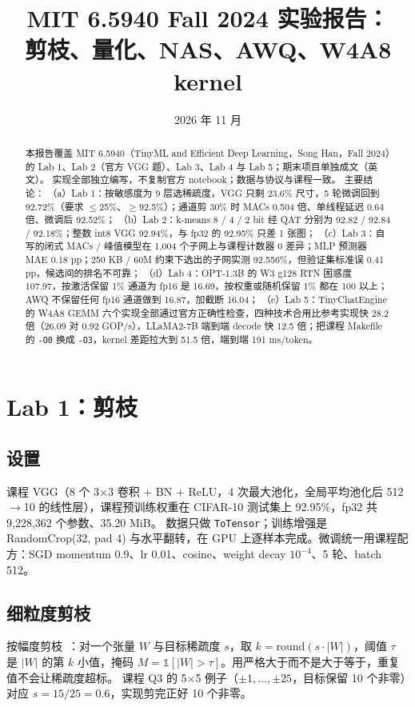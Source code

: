 \documentclass[11pt,a4paper]{ctexart}
\title{MIT 6.5940 Fall 2024 实验报告：\\剪枝、量化、NAS、AWQ、W4A8 kernel}
\author{\authorline}
\date{2026 年 11 月}
\begin{document}
\maketitle

\begin{abstract}
本报告覆盖 MIT 6.5940（TinyML and Efficient Deep Learning，Song Han，Fall 2024）的 Lab 1、Lab 2（官方 VGG 题）、Lab 3、Lab 4 与 Lab 5；期末项目单独成文（英文）。
实现全部独立编写，不复制官方 notebook；数据与协议与课程一致。
主要结论：
（a）Lab 1：按敏感度为 9 层选稀疏度，VGG 只剩 23.6\% 尺寸，5 轮微调回到 92.72\%（要求 $\le$25\%、$\ge$92.5\%）；通道剪 30\% 时 MACs 0.504 倍、单线程延迟 0.64 倍、微调后 92.52\%；
（b）Lab 2：k-means 8 / 4 / 2 bit 经 QAT 分别为 92.82 / 92.84 / 92.18\%；整数 int8 VGG 92.94\%，与 fp32 的 92.95\% 只差 1 张图；
（c）Lab 3：自写的闭式 MACs / 峰值模型在 1,004 个子网上与课程计数器 0 差异；MLP 预测器 MAE 0.18 pp；250 KB / 60M 约束下选出的子网实测 92.556\%，但验证集标准误 0.41 pp，候选间的排名不可靠；
（d）Lab 4：OPT-1.3B 的 W3 g128 RTN 困惑度 107.97，按激活保留 1\% 通道为 fp16 是 16.69，按权重或随机保留 1\% 都在 100 以上；AWQ 不保留任何 fp16 通道做到 16.87，加截断 16.04；
（e）Lab 5：TinyChatEngine 的 W4A8 GEMM 六个实现全部通过官方正确性检查，四种技术合用比参考实现快 28.2 倍（26.09 对 0.92 GOP/s），LLaMA2-7B 端到端 decode 快 12.5 倍；把课程 Makefile 的 \texttt{-O0} 换成 \texttt{-O3}，kernel 差距拉大到 51.5 倍，端到端 191 ms/token。
\end{abstract}

\tableofcontents
\newpage

\section{Lab 1：剪枝}\label{sec:lab1}

\subsection{设置}
课程 VGG（8 个 3$\times$3 卷积 + BN + ReLU，4 次最大池化，全局平均池化后 512$\to$10 的线性层），课程预训练权重在 CIFAR-10 测试集上 92.95\%，fp32 共 9,228,362 个参数、35.20 MiB。
数据只做 \texttt{ToTensor}；训练增强是 RandomCrop(32, pad 4) 与水平翻转，在 GPU 上逐样本完成。微调统一用课程配方：SGD momentum 0.9、lr 0.01、cosine、weight decay $10^{-4}$、5 轮、batch 512。

\subsection{细粒度剪枝}
按幅度剪枝~\cite{han2015}：对一个张量 $W$ 与目标稀疏度 $s$，取 $k=\mathrm{round}(s\cdot|W|)$，阈值 $\tau$ 是 $|W|$ 的第 $k$ 小值，掩码 $M=\mathbb{1}[|W|>\tau]$。用严格大于而不是大于等于，重复值不会让稀疏度超标。
课程 Q3 的 5$\times$5 例子（$\pm1,\dots,\pm25$，目标保留 10 个非零）对应 $s=15/25=0.6$，实现剪完正好 10 个非零。
\end{document}
